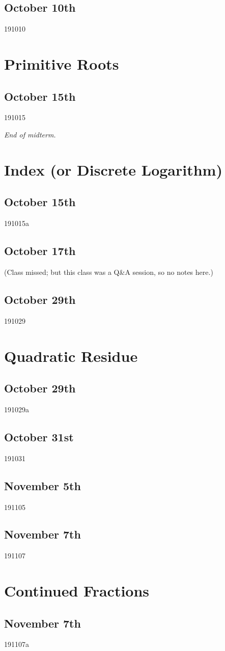 \subsection{October 10th}
{191010}

\section{Primitive Roots}
\subsection{October 15th}
{191015}

\noindent\makebox[\linewidth]{\rule{\linewidth}{0.4pt}}
\begin{flushright}
    \textit{End of midterm.}
\end{flushright}

\newpage
\section{Index (or Discrete Logarithm)}
\subsection{October 15th}
{191015a}

\subsection{October 17th}
(Class missed; but this class was a Q\&A session, so no notes here.)

\subsection{October 29th}
{191029}

\section{Quadratic Residue}

\subsection{October 29th}
{191029a}

\subsection{October 31st}
{191031}

\subsection{November 5th}
{191105}

\subsection{November 7th}
{191107}

\section{Continued Fractions}
\subsection{November 7th}
{191107a}


